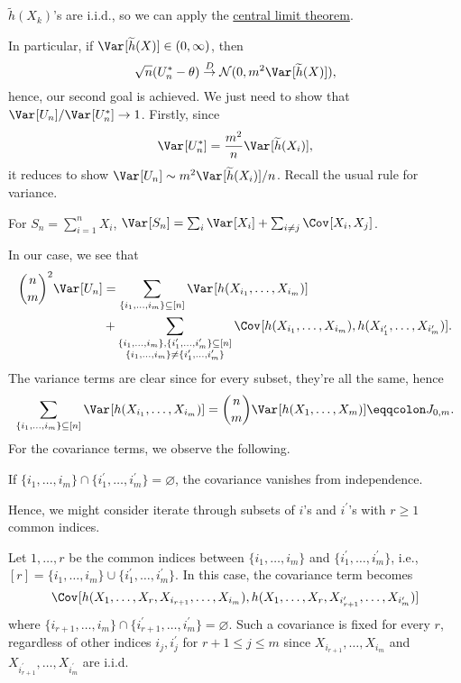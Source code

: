\begin{note}
	\(\widetilde{h} (X_k)\)'s are i.i.d., so we can apply the \hyperref[thm:CLT]{central limit theorem}.
\end{note}

In particular, if \(\Var_{}[\widetilde{h} (X)] \in (0, \infty )\), then
\[
	\sqrt{n} (U_n^{\ast} - \theta ) \overset{D}{\to} \mathcal{N} (0, m^2 \Var_{}[\widetilde{h} (X)] ),
\]
hence, our second goal is achieved. We just need to show that \(\Var_{}[U_n] / \Var_{}[U_n^{\ast} ] \to 1\). Firstly, since
\[
	\Var_{}[U_n^{\ast} ]
	= \frac{m^2}{n} \Var_{}[\widetilde{h} (X_i)],
\]
it reduces to show \(\Var_{}[U_n] \sim m^2 \Var_{}[\widetilde{h} (X_i)] / n\). Recall the usual rule for variance.

\begin{prev}
	For \(S_n = \sum_{i=1}^{n} X_i\), \(\Var_{}[S_n] = \sum_{i} \Var_{}[X_i] + \sum_{i \neq j} \Cov_{}[X_i, X_j]\).
\end{prev}
In our case, we see that
\[
	\begin{split}
		\binom{n}{m}^2 \Var_{}[U_n]
		 & = \sum_{\{ i_1, \dots , i_m \} \subseteq [n]} \Var_{}[h(X_{i_1}, \dots , X_{i_m})]                 \\
		 & + \sum_{\substack{\{ i_1, \dots , i_m \} , \{ i_1^{\prime} , \dots , i_m^{\prime} \} \subseteq [n] \\ \{ i_1 , \dots , i_m \} \neq \{ i_1^{\prime} , \dots , i_m^{\prime} \}}} \Cov_{}[h(X_{i_1}, \dots , X_{i_m}), h(X_{i_1^{\prime} }, \dots , X_{i_m^{\prime} })].
	\end{split}
\]
The variance terms are clear since for every subset, they're all the same, hence
\[
	\sum_{\{ i_1, \dots , i_m \} \subseteq [n]} \Var_{}[h(X_{i_1}, \dots , X_{i_m})]
	= \binom{n}{m} \Var_{}[h(X_1, \dots , X_m)]
	\eqqcolon J_{0, m}.
\]
For the covariance terms, we observe the following.

\begin{intuition}
	If \(\{ i_1, \dots , i_m \} \cap \{ i_1^{\prime} , \dots , i_m^{\prime}  \} = \varnothing \), the covariance vanishes from independence.
\end{intuition}

Hence, we might consider iterate through subsets of \(i\)'s and \(i^{\prime} \)'s with \(r \geq 1\) common indices.

\begin{eg}
	Let \(1, \dots , r\) be the common indices between \(\{i_1, \dots , i_m \} \) and \(\{ i_1^{\prime} , \dots , i_m^{\prime} \} \), i.e., \([r] = \{i_1, \dots , i_m \} \cup \{ i_1^{\prime} , \dots , i_m^{\prime} \}\). In this case, the covariance term becomes
	\[
		\Cov_{}[h(X_1, \dots , X_r, X_{i_{r+1}}, \dots , X_{i_m}), h(X_1, \dots , X_r, X_{i_{r+1}^{\prime} }, \dots , X_{i_m^{\prime} })]
	\]
	where \(\{ i_{r+1} , \dots , i_m \} \cap \{ i_{r+1}^{\prime} , \dots , i_m^{\prime} \} = \varnothing \). Such a covariance is fixed for every \(r\), regardless of other indices \(i_j , i_j^{\prime} \) for \(r+1 \leq j \leq m\) since \(X_{i_{r+1}}, \dots , X_{i_m}\) and \(X_{i_{r+1}^{\prime} }, \dots , X_{i_m^{\prime} }\) are i.i.d.
\end{eg}

